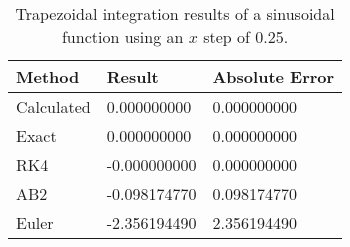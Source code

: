 \begin{singlespace}
\begin{table}[H]
	\centering
	\begin{tabular}{@{} l l l  @{}} 	
		\toprule %
		\footnotesize %
		\raggedright %
		Method	&		Result & Absolute Error		\\
		\midrule		
%
Calculated& 	0.000000000&	0.000000000 \\
Exact & 	0.000000000	& 0.000000000 \\
RK4 &	-0.000000000 &	0.000000000 \\
AB2 & 	-0.098174770 &	0.098174770 \\
Euler & 	-2.356194490 &	2.356194490\\
%
		\bottomrule
	\end{tabular}
	\caption{Trapezoidal integration results of a sinusoidal function using an $x$ step of 0.25.}
	\label{tab: trap sin res}
\end{table}
\end{singlespace}
	
	